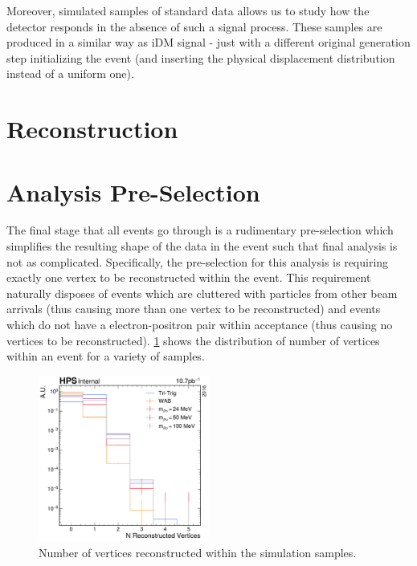 Moreover, simulated samples of standard data allows us to study how the detector responds in the
absence of such a signal process. These samples are produced in a similar way as iDM signal - just
with a different original generation step initializing the event (and inserting the physical
displacement distribution instead of a uniform one).

\section{Reconstruction}

\section{Analysis Pre-Selection}
The final stage that all events go through is a rudimentary pre-selection which simplifies the
resulting shape of the data in the event such that final analysis is not as complicated.
Specifically, the pre-selection for this analysis is requiring exactly one vertex to be
reconstructed within the event. This requirement naturally disposes of events which are cluttered
with particles from other beam arrivals (thus causing more than one vertex to be reconstructed) and
events which do not have a electron-positron pair within acceptance (thus causing no vertices to be
reconstructed). \cref{fig:n-vertex-pre-selection} shows the distribution of number of vertices
within an event for a variety of samples.

\begin{figure}
  \centering
  \includegraphics[width=0.5\textwidth]{figures/hps/dataset/n-vertex-pre-selection-mc-only.pdf}
  \caption{Number of vertices reconstructed within the simulation samples.}
  \label{fig:n-vertex-pre-selection}
\end{figure}